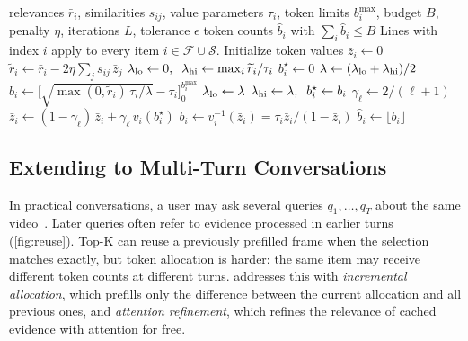 \begin{algorithm}[t]
\caption{Iterative Water-Filling}
\label{alg:iwf}
\small
\begin{algorithmic}[1]
\Require relevances $\bar r_i$, similarities $s_{ij}$, value parameters $\tau_i$, token limits $b_i^{\max}$, budget $B$, penalty $\eta$, iterations $L$, tolerance $\epsilon$
\Ensure token counts $\hat b_i$ with $\sum_i\hat b_i\le B$
\Statex Lines with index $i$ apply to every item $i\in\mathcal F\cup\mathcal S$.
\State Initialize token values $\bar z_i\gets 0$
  \State $\widetilde r_i\gets\bar r_i-2\eta\sum_{j}s_{ij}\,\bar z_j$ 
  \State $\lambda_{\rm lo}\gets 0,\;\;\lambda_{\rm hi}\gets\max_i\widetilde r_i/\tau_i$ 
  \State $b_i^\star\gets 0$ 
   
    \State $\lambda\gets(\lambda_{\rm lo}+\lambda_{\rm hi})/2$
    \State $b_i\gets\big[\sqrt{\max(0,\widetilde r_i)\,\tau_i/\lambda}-\tau_i\big]_0^{b_i^{\max}}$ 
      \State $\lambda_{\rm lo}\gets\lambda$ 
    \Else
      \State $\lambda_{\rm hi}\gets\lambda,\;\;b_i^\star\gets b_i$ 
    \EndIf
  \EndWhile
  \State $\gamma_\ell\gets 2/(\ell+1)$ 
  \State $\bar z_i\gets(1-\gamma_\ell)\,\bar z_i+\gamma_\ell\,v_i(b_i^\star)$ 
\EndFor
\State $b_i\gets v_i^{-1}(\bar z_i)=\tau_i\bar z_i/(1-\bar z_i)$ 
\State \Return $\hat b_i\gets\lfloor b_i\rfloor$ 
\end{algorithmic}
\end{algorithm}









\subsection{Extending to Multi-Turn Conversations}
\label{sec:multiturn}



In practical conversations, a user may ask several queries $q_1,\dots,q_T$ about the same video~\cite{hsieh2018focus}. Later queries often refer to evidence processed in earlier turns (\cref{fig:reuse}). Top-K can reuse a previously prefilled frame when the selection matches exactly, but token allocation is harder: the same item may receive different token counts at different turns. \name addresses this with \emph{incremental allocation}, which prefills only the difference between the current allocation and all previous ones, and \emph{attention refinement}, which refines the relevance of cached evidence with attention for free.


